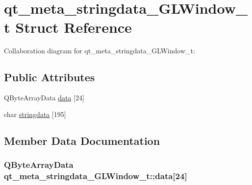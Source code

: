 \hypertarget{structqt__meta__stringdata__GLWindow__t}{}\section{qt\+\_\+meta\+\_\+stringdata\+\_\+\+G\+L\+Window\+\_\+t Struct Reference}
\label{structqt__meta__stringdata__GLWindow__t}


Collaboration diagram for qt\+\_\+meta\+\_\+stringdata\+\_\+\+G\+L\+Window\+\_\+t\+:
\subsection*{Public Attributes}
\begin{DoxyCompactItemize}
\item 
Q\+Byte\+Array\+Data \hyperlink{structqt__meta__stringdata__GLWindow__t_af75fccb7d02e5a664be08111cf59cb94}{data} \mbox{[}24\mbox{]}
\item 
char \hyperlink{structqt__meta__stringdata__GLWindow__t_a2c0ffd4837cfdbab8ead589d19d1d0cb}{stringdata} \mbox{[}195\mbox{]}
\end{DoxyCompactItemize}


\subsection{Member Data Documentation}
\hypertarget{structqt__meta__stringdata__GLWindow__t_af75fccb7d02e5a664be08111cf59cb94}{}
\subsubsection[{data}]{\setlength{\rightskip}{0pt plus 5cm}Q\+Byte\+Array\+Data qt\+\_\+meta\+\_\+stringdata\+\_\+\+G\+L\+Window\+\_\+t\+::data\mbox{[}24\mbox{]}}\label{structqt__meta__stringdata__GLWindow__t_af75fccb7d02e5a664be08111cf59cb94}
\hypertarget{structqt__meta__stringdata__GLWindow__t_a2c0ffd4837cfdbab8ead589d19d1d0cb}{}
